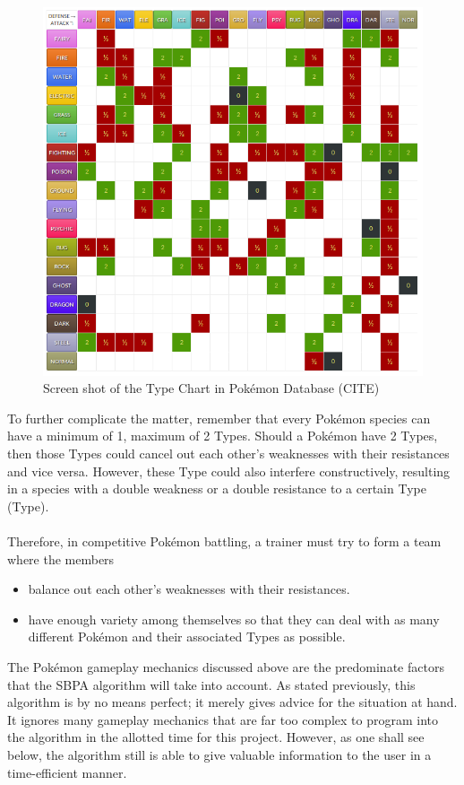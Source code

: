 \documentclass{article}
\begin{document}
\begin{figure}[H]
	\includegraphics[width=\textwidth]{TypeChart.png}
	\centering
	\caption{Screen shot of the Type Chart in Pok\'emon Database (CITE)}
\end{figure}
To further complicate the matter, remember that every Pok\'emon species can have a minimum of 1, maximum of 2 Types. Should a Pok\'emon have 2 Types, then those Types could cancel out each other's weaknesses with their resistances and vice versa. However, these Type could also interfere constructively, resulting in a species with a double weakness or a double resistance to a certain Type (Type).\\\\
Therefore, in competitive Pok\'emon battling, a trainer must try to form a team where the members
\begin{itemize}
	\item balance out each other's weaknesses with their resistances.
	\item have enough variety among themselves so that they can deal with as many different Pok\'emon and their associated Types as possible.
\end{itemize}
The Pok\'emon gameplay mechanics discussed above are the predominate factors that the SBPA algorithm will take into account. As stated previously, this algorithm is by no means perfect; it merely gives advice for the situation at hand. It ignores many gameplay mechanics that are far too complex to program into the algorithm in the allotted time for this project. However, as one shall see below, the algorithm still is able to give valuable information to the user in a time-efficient manner.
\end{document}
